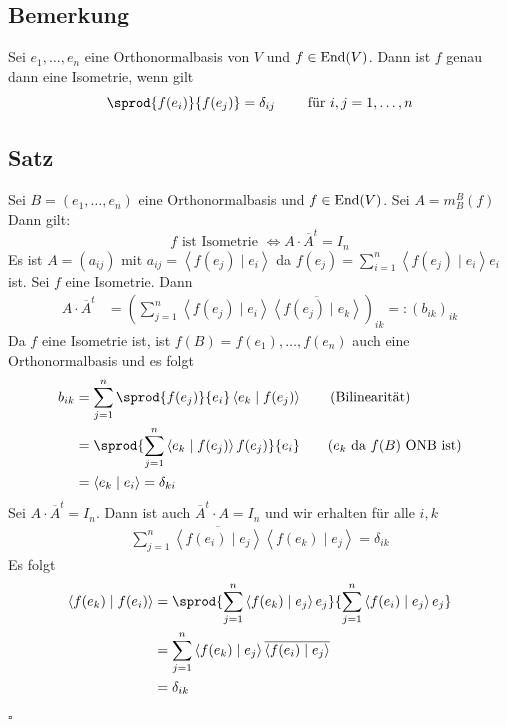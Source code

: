 \subsection[Bemerkung für eine Orthonormalbasis]{Bemerkung} %
\label{sub:13}
Sei $e_1, \ldots , e_n$ eine Orthonormalbasis  von $V$ und $f \in \operatorname{End}(V)$. Dann ist $f$ genau dann eine Isometrie, wenn gilt
\[
	\sprod{f(e_i)}{f(e_j)} = \delta_{ij} \qquad \text{ für } i,j = 1, \ldots , n
\]

\subsection[Satz über Isometrie und Matrizenprodukt]{Satz} %
\label{sub:satz14}
Sei $B= (e_1, \ldots , e_n)$ eine Orthonormalbasis und $f \in \operatorname{End}(V)$. Sei $A= m_B^B(f)$ Dann gilt:
\[
	f \text{ ist Isometrie } \iff A \cdot \overline{A}^t = I_n 
\]
Es ist $A= (a_{ij})$ mit $a_{ij} = \left\langle f(e_j) \mid e_i \right\rangle $ da $f(e_j)= \sum_{i=1}^{n} \left\langle f(e_j) \mid e_i \right\rangle e_i$ ist.
Sei $f$ eine Isometrie. Dann 
\begin{align*}
	A \cdot \overline{A}^t &= \left( \sum_{j=1}^{n} \left\langle f(e_j) \mid e_i \right\rangle  \overline{\left\langle f(e_j) \mid e_k \right\rangle }  
	\right)_{ik} =: (b_{ik})_{ik}
\end{align*}
Da $f$ eine Isometrie ist, ist $f(B)= f(e_1), \ldots , f(e_n)$ auch eine Orthonormalbasis und es folgt
\begin{align*}
	b_{ik} &= \sum_{j=1}^{n} \sprod{f(e_j)}{e_i}  \left\langle e_k \mid f(e_j) \right\rangle \tag{Bilinearität}\\
	&= \sprod{\sum_{j=1}^{n} \left\langle e_k \mid f(e_j) \right\rangle  f(e_j)}{e_i} \tag{$e_k$ da $f(B)$ ONB ist} \\
	&= \left\langle e_k \mid e_i \right\rangle = \delta_{ki}
\end{align*}
Sei $A \cdot \overline{A}^t= I_n $. Dann ist auch $\overline{A}^t \cdot A = I_n $ und wir erhalten für alle $i,k$
\begin{align*}
	\sum_{j=1}^{n} \overline{\left\langle f(e_i) \mid e_j \right\rangle } \left\langle f(e_k) \mid e_j \right\rangle  = \delta_{ik}
\end{align*}
Es folgt
\begin{align*}
	\left\langle f(e_k) \mid f(e_i) \right\rangle &= \sprod{\sum_{j=1}^{n} \left\langle f (e_k) \mid e_j \right\rangle e_j}
	{\sum_{j=1}^{n} \left\langle f(e_i) \mid e_j \right\rangle e_j} \\
	&= \sum_{j=1}^{n} \left\langle f(e_k) \mid e_j \right\rangle \overline{\left\langle f(e_i) \mid e_j \right\rangle } \\
	&= \delta_{ik}
\end{align*}
\hfill \( \square \)

